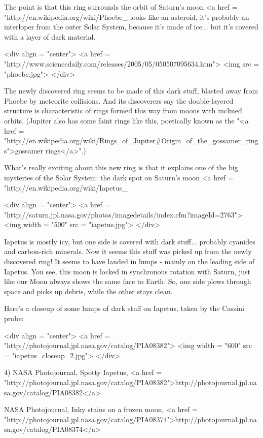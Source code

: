 The point is that this ring surrounds the orbit of Saturn's moon
<a href = "http://en.wikipedia.org/wiki/Phoebe_%
looks like an asteroid, it's probably an interloper from the outer
Solar System, because it's made of ice... but it's covered with a
layer of dark material. 

<div align = "center">
<a href = "http://www.sciencedaily.com/releases/2005/05/050507095634.htm">
<img src = "phoebe.jpg">
</div>

The newly discovered ring seems to be made of this dark stuff,
blasted away from Phoebe by meteorite collisions.  And its discoverers 
say the double-layered structure is characteristic of rings formed this 
way from moons with inclined orbits.  (Jupiter also has some faint rings 
like this, poetically known as the "<a href = 
"http://en.wikipedia.org/wiki/Rings_of_Jupiter#Origin_of_the_gossamer_rings">gossamer 
rings</a>".) 

What's really exciting about this new ring is that it explains one of
the big mysteries of the Solar System: the dark spot on Saturn's moon
<a href =
"http://en.wikipedia.org/wiki/Iapetus_%

<div align = "center">
<a href = "http://saturn.jpl.nasa.gov/photos/imagedetails/index.cfm?imageId=2763">
<img width = "500" src = "iapetus.jpg">
</div>

Iapetus is mostly icy, but one side is covered with dark stuff...
probably cyanides and carbon-rich minerals.  Now it seems this stuff
was picked up from the newly discovered ring!  It seems to have landed
in lumps - mainly on the leading side of Iapetus.  You see, this moon
is locked in synchronous rotation with Saturn, just like our Moon always
shows the same face to Earth.  So, one side plows through space and 
picks up debris, while the other stays clean.

Here's a closeup of some lumps of dark stuff on Iapetus, taken by the
Cassini probe:

<div align = "center">
<a href = "http://photojournal.jpl.nasa.gov/catalog/PIA08382">
<img width = "600" src = "iapetus_closeup_2.jpg">
</div>

4) NASA Photojournal, Spotty Iapetus, 
<a href = "http://photojournal.jpl.nasa.gov/catalog/PIA08382">http://photojournal.jpl.nasa.gov/catalog/PIA08382</a>

NASA Photojournal, Inky stains on a frozen moon, 
 <a href = "http://photojournal.jpl.nasa.gov/catalog/PIA08374">http://photojournal.jpl.nasa.gov/catalog/PIA08374</a>

